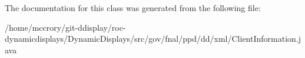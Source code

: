 The documentation for this class was generated from the following file\-:\begin{DoxyCompactItemize}
\item 
/home/mccrory/git-\/ddisplay/roc-\/dynamicdisplays/\-Dynamic\-Displays/src/gov/fnal/ppd/dd/xml/Client\-Information.\-java\end{DoxyCompactItemize}
